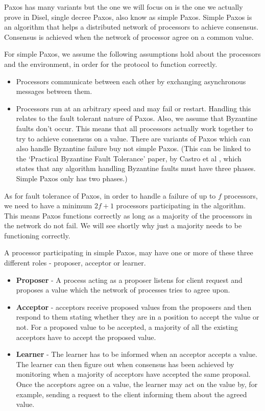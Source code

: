 Paxos has many variants but the one we will focus on is the one we actually prove
in Disel, single decree Paxos, also know as simple Paxos. Simple Paxos is an algorithm
that helps a distributed network of processors to achieve consensus.
Consensus is achieved when the network of processor agree on a common value.

For simple Paxos, we assume the following assumptions hold about the processors
and the environment, in order for the protocol to function correctly.
\begin{itemize}
  \item Processors communicate between each other by exchanging asynchronous messages between them.
  \item Processors run at an arbitrary speed and may fail or restart. Handling this relates
    to the fault tolerant nature of Paxos. Also, we assume that Byzantine faults don't occur.
    This means that all processors actually work together to try to achieve consensus on a value.
    There are variants of Paxos which can also handle Byzantine failure buy not simple Paxos.
    (This can be linked to the `Practical Byzantine Fault Tolerance' paper, by Castro et al \cite{2},
    which states that any algorithm handling
    Byzantine faults must have three phases. Simple Paxos only has two phases.)
\end{itemize}

As for fault tolerance of Paxos, in order to handle a failure of up to $f$ processors,
we need to have a minimum $2f + 1$ processors participating in the algorithm. This
means Paxos functions correctly as long as a majority of the processors in the
network do not fail. We will see shortly why just a majority needs to be functioning
correctly.

A processor participating in simple Paxos, may have one or more of these three
different roles - proposer, acceptor or learner.
\begin{itemize}
  \item \textbf{Proposer} - A process acting as a proposer listens for client
    request and proposes a value which the network of processes tries to agree upon.
  \item \textbf{Acceptor} - acceptors receive proposed values from the proposers
    and then respond to them stating whether they are in a position to accept the value or not.
    For a proposed value to be accepted, a majority of all the existing acceptors
    have to accept the proposed value.
  \item \textbf{Learner} - The learner has to be informed when an acceptor accepts a value.
    The learner can then figure out when consensus has been achieved by monitoring
    when a majority of acceptors have accepted the same proposal.
    Once the acceptors agree on a value, the learner may act on the value by,
    for example, sending a request to the client informing them about the agreed value.
\end{itemize}

